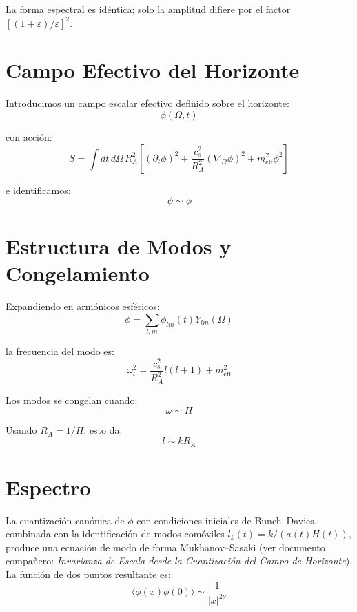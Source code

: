 \documentclass[12pt,a4paper]{article}
\begin{document}
La forma espectral es idéntica; solo la amplitud difiere por el factor $[(1+\varepsilon)/\varepsilon]^2$.

\section{Campo Efectivo del Horizonte}

Introducimos un campo escalar efectivo definido sobre el horizonte:
\begin{equation}
\phi(\Omega, t) \tag{22}
\end{equation}

con acción:
\begin{equation}
S = \int dt\, d\Omega\, R_A^2 \left[(\partial_t\phi)^2 + \frac{c_s^2}{R_A^2}(\nabla_\Omega\phi)^2 + m_\text{eff}^2\phi^2\right] \tag{23}
\end{equation}

e identificamos:
\begin{equation}
\psi \sim \phi \tag{24}
\end{equation}

\section{Estructura de Modos y Congelamiento}

Expandiendo en armónicos esféricos:
\begin{equation}
\phi = \sum_{l,m} \phi_{lm}(t) Y_{lm}(\Omega) \tag{25}
\end{equation}

la frecuencia del modo es:
\begin{equation}
\omega_l^2 = \frac{c_s^2}{R_A^2}l(l+1) + m_\text{eff}^2 \tag{26}
\end{equation}

Los modos se congelan cuando:
\begin{equation}
\omega \sim H \tag{27}
\end{equation}

Usando $R_A = 1/H$, esto da:
\begin{equation}
l \sim kR_A \tag{28}
\end{equation}

\section{Espectro}

La cuantización canónica de $\phi$ con condiciones iniciales de Bunch--Davies, combinada con la identificación de modos comóviles $l_k(t) = k/(a(t)H(t))$, produce una ecuación de modo de forma Mukhanov--Sasaki (ver documento compañero: \textit{Invarianza de Escala desde la Cuantización del Campo de Horizonte}). La función de dos puntos resultante es:
\begin{equation}
\langle\phi(x)\phi(0)\rangle \sim \frac{1}{|x|^{2\nu}} \tag{29}
\end{equation}
\end{document}
